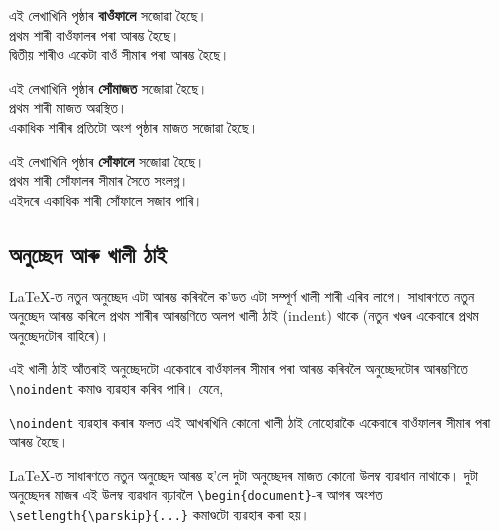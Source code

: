 \documentclass[12pt,a4paper]{article} %
\begin{document}
	\begin{flushleft}
		এই লেখাখিনি পৃষ্ঠাৰ \textbf{বাওঁফালে} সজোৱা হৈছে।\\
		প্ৰথম শাৰী বাওঁফালৰ পৰা আৰম্ভ হৈছে।\\
		দ্বিতীয় শাৰীও একেটা বাওঁ সীমাৰ পৰা আৰম্ভ হৈছে।
	\end{flushleft}

	\begin{center}
		এই লেখাখিনি পৃষ্ঠাৰ \textbf{সোঁমাজত} সজোৱা হৈছে।\\
		প্ৰথম শাৰী মাজত অৱস্থিত।\\
		একাধিক শাৰীৰ প্ৰতিটো অংশ পৃষ্ঠাৰ মাজত সজোৱা হৈছে।
	\end{center}
	
	\begin{flushright}
		এই লেখাখিনি পৃষ্ঠাৰ \textbf{সোঁফালে} সজোৱা হৈছে।\\
		প্ৰথম শাৰী সোঁফালৰ সীমাৰ সৈতে সংলগ্ন।\\
		এইদৰে একাধিক শাৰী সোঁফালে সজাব পাৰি।
	\end{flushright}
	
	\subsection{অনুচ্ছেদ আৰু খালী ঠাই}
	
	\LaTeX{}-ত নতুন অনুচ্ছেদ এটা আৰম্ভ কৰিবলৈ ক'ডত এটা সম্পূৰ্ণ খালী শাৰী এৰিব লাগে। সাধাৰণতে নতুন অনুচ্ছেদ আৰম্ভ কৰিলে প্ৰথম শাৰীৰ আৰম্ভণিতে অলপ খালী ঠাই (indent) থাকে (নতুন খণ্ডৰ একেবাৰে প্ৰথম অনুচ্ছেদটোৰ বাহিৰে)। 
	
	এই খালী ঠাই আঁতৰাই অনুচ্ছেদটো একেবাৰে বাওঁফালৰ সীমাৰ পৰা আৰম্ভ কৰিবলৈ অনুচ্ছেদটোৰ আৰম্ভণিতে \texttt{\textbackslash noindent} কমাণ্ড ব্যৱহাৰ কৰিব পাৰি। যেনে,
	
	\noindent \texttt{\textbackslash noindent} ব্যৱহাৰ কৰাৰ ফলত এই আখৰখিনি কোনো খালী ঠাই নোহোৱাকৈ একেবাৰে বাওঁফালৰ সীমাৰ পৰা আৰম্ভ হৈছে।
	
	\LaTeX{}-ত সাধাৰণতে নতুন অনুচ্ছেদ আৰম্ভ হ'লে দুটা অনুচ্ছেদৰ মাজত কোনো উলম্ব ব্যৱধান নাথাকে। দুটা অনুচ্ছেদৰ মাজৰ এই উলম্ব ব্যৱধান বঢ়াবলৈ \texttt{\textbackslash begin\{document\}}-ৰ আগৰ অংশত \texttt{\textbackslash setlength\{\textbackslash parskip\}\{...\}} কমাণ্ডটো ব্যৱহাৰ কৰা হয়।
	
\end{document}
